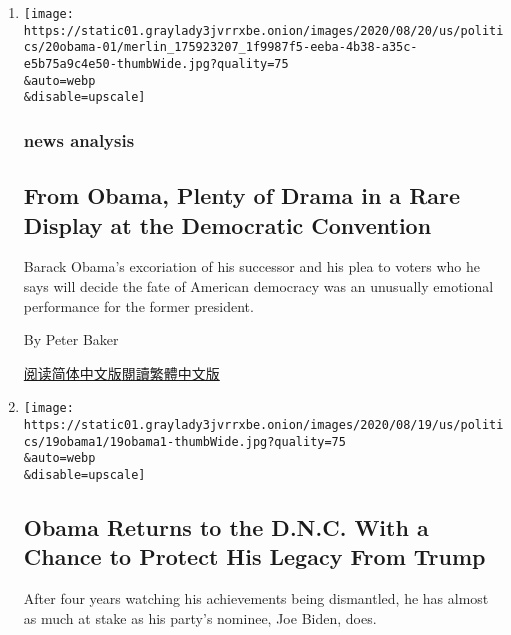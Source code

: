 \begin{enumerate}
\def\labelenumi{\arabic{enumi}.}
\item
  \href{/2020/08/20/us/politics/obama-trump-democratic-convention.html}{}

  \texttt{[image: https://static01.graylady3jvrrxbe.onion/images/2020/08/20/us/politics/20obama-01/merlin\_175923207\_1f9987f5-eeba-4b38-a35c-e5b75a9c4e50-thumbWide.jpg?quality=75\\\&auto=webp\\\&disable=upscale]}

  \hypertarget{news-analysis}{%
  \subsubsection{news analysis}\label{news-analysis}}

  \hypertarget{from-obama-plenty-of-drama-in-a-rare-display-at-the-democratic-convention}{%
  \subsection{From Obama, Plenty of Drama in a Rare Display at the
  Democratic
  Convention}\label{from-obama-plenty-of-drama-in-a-rare-display-at-the-democratic-convention}}

  Barack Obama's excoriation of his successor and his plea to voters who
  he says will decide the fate of American democracy was an unusually
  emotional performance for the former president.

  By Peter Baker

  \href{https://cn.nytimes3xbfgragh.onion/usa/20200821/obama-trump-democratic-convention/}{阅读简体中文版}\href{https://cn.nytimes3xbfgragh.onion/usa/20200821/obama-trump-democratic-convention/zh-hant/}{閱讀繁體中文版}
\item
  \href{/2020/08/19/us/politics/barack-obama-dnc-trump.html}{}

  \texttt{[image: https://static01.graylady3jvrrxbe.onion/images/2020/08/19/us/politics/19obama1/19obama1-thumbWide.jpg?quality=75\\\&auto=webp\\\&disable=upscale]}

  \hypertarget{obama-returns-to-the-dnc-with-a-chance-to-protect-his-legacy-from-trump}{%
  \subsection{Obama Returns to the D.N.C. With a Chance to Protect His
  Legacy From
  Trump}\label{obama-returns-to-the-dnc-with-a-chance-to-protect-his-legacy-from-trump}}

  After four years watching his achievements being dismantled, he has
  almost as much at stake as his party's nominee, Joe Biden, does.


\end{enumerate}
